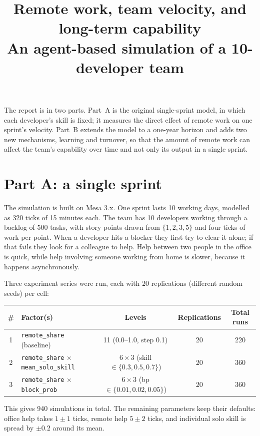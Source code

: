\documentclass[11pt,a4paper]{article}
\title{Remote work, team velocity, and long-term capability\\
       \large An agent-based simulation of a 10-developer team}
\author{}
\date{}
\begin{document}
\maketitle

The report is in two parts. Part~A is the original single-sprint model, in which each
developer's skill is fixed; it measures the direct effect of remote work on one sprint's
velocity. Part~B extends the model to a one-year horizon and adds two new mechanisms, learning
and turnover, so that the amount of remote work can affect the team's capability over time and
not only its output in a single sprint.

\section*{Part A: a single sprint}

The simulation is built on Mesa 3.x. One sprint lasts 10 working days, modelled as 320 ticks of
15 minutes each. The team has 10 developers working through a backlog of 500 tasks, with story
points drawn from $\{1,2,3,5\}$ and four ticks of work per point. When a developer hits a blocker
they first try to clear it alone; if that fails they look for a colleague to help. Help between
two people in the office is quick, while help involving someone working from home is slower,
because it happens asynchronously.

Three experiment series were run, each with 20 replications (different random seeds) per cell:

\begin{center}
\begin{tabular}{clccc}
\toprule
\# & Factor(s) & Levels & Replications & Total runs \\
\midrule
1 & \texttt{remote_share} (baseline)            & 11 (0.0--1.0, step 0.1)        & 20 & 220 \\
2 & \texttt{remote_share} $\times$ \texttt{mean_solo_skill} & $6\times3$ (skill $\in\{0.3,0.5,0.7\}$) & 20 & 360 \\
3 & \texttt{remote_share} $\times$ \texttt{block_prob}      & $6\times3$ (bp $\in\{0.01,0.02,0.05\}$)  & 20 & 360 \\
\bottomrule
\end{tabular}
\end{center}

This gives 940 simulations in total. The remaining parameters keep their defaults: office help
takes $1\pm1$ ticks, remote help $5\pm2$ ticks, and individual solo skill is spread by $\pm0.2$
around its mean.
\end{document}
